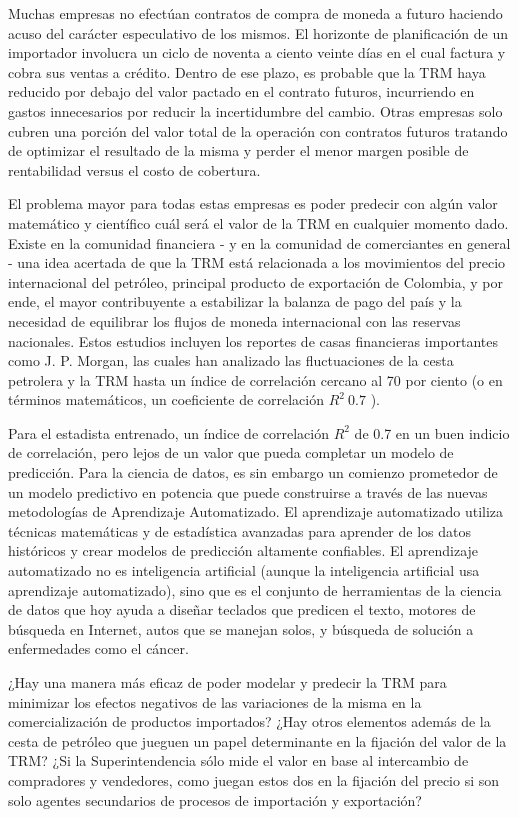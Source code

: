 \documentclass[letterpaper, spanish, 11pt]{report}
\begin{document}
Muchas empresas no efectúan contratos de compra de moneda a futuro haciendo acuso del carácter especulativo de los mismos. El horizonte de planificación de un importador involucra un ciclo de noventa a ciento veinte días en el cual factura y cobra sus ventas a crédito. Dentro de ese plazo, es probable que la TRM haya reducido por debajo del valor pactado en el contrato futuros, incurriendo en gastos innecesarios por reducir la incertidumbre del cambio. Otras empresas solo cubren una porción del valor total de la operación con contratos futuros tratando de optimizar el resultado de la misma y perder el menor margen posible de rentabilidad versus el costo de cobertura. 

El problema mayor para todas estas empresas es poder predecir con algún valor matemático y científico cuál será el valor de la TRM en cualquier momento dado. Existe en la comunidad financiera - y en la comunidad de comerciantes en general - una idea acertada de que la TRM está relacionada a los movimientos del precio internacional del petróleo, principal producto de exportación de Colombia, y por ende, el mayor contribuyente a estabilizar la balanza de pago del país y la necesidad de equilibrar los flujos de moneda internacional con las reservas nacionales. Estos estudios incluyen los reportes de casas financieras importantes como J. P. Morgan, las cuales han analizado las fluctuaciones de la cesta petrolera y la TRM hasta un índice de correlación cercano al 70 por ciento (o en términos matemáticos, un coeficiente de correlación \(R^{2} ~ 0.7\) ). 

Para el estadista entrenado, un índice de correlación \(R^{2}\) de 0.7 en un buen indicio de correlación, pero lejos de un valor que pueda completar un modelo de predicción. Para la ciencia de datos, es sin embargo un comienzo prometedor de un modelo predictivo en potencia que puede construirse a través de las nuevas metodologías de Aprendizaje Automatizado. El aprendizaje automatizado utiliza técnicas matemáticas y de estadística avanzadas para aprender de los datos históricos y crear modelos de predicción altamente confiables. El aprendizaje automatizado no es inteligencia artificial (aunque la inteligencia artificial usa aprendizaje automatizado), sino que es el conjunto de herramientas de la ciencia de datos que hoy ayuda a diseñar teclados que predicen el texto, motores de búsqueda en Internet, autos que se manejan solos, y búsqueda de solución a enfermedades como el cáncer. 

¿Hay una manera más eficaz de poder modelar y predecir la TRM para minimizar los efectos negativos de las variaciones de la misma en la comercialización de productos importados? ¿Hay otros elementos además de la cesta de petróleo que jueguen un papel determinante en la fijación del valor de la TRM? ¿Si la Superintendencia sólo mide el valor en base al intercambio de compradores y vendedores, como juegan estos dos en la fijación del precio si son solo agentes secundarios de procesos de importación y exportación?
\end{document}

